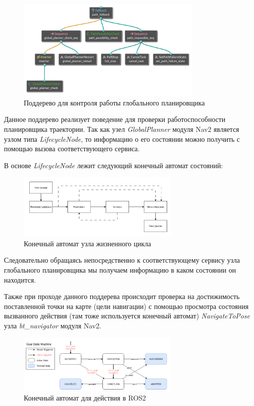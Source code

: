 \begin{figure}[h]
    \centering
    \includegraphics[width=0.8\textwidth]{images/chap_3/global_planner_subtree.png}
    \caption{Поддерево для контроля работы глобального планировщика}
    \label{fig:global_planner_subtree}
\end{figure}

Данное поддерево реализует поведение для проверки работоспособности планировщика траектории. Так как узел \textit{GlobalPlanner} модуля Nav2 является узлом типа \textit{LifecycleNode}, то информацию о его состоянии можно получить с помощью вызова соответствующего сервиса. 

В основе \textit{LifecycleNode} лежит следующий конечный автомат состояний:

\begin{figure}[h]
    \centering
    \includegraphics[width=0.7\textwidth]{images/chap_3/lifecycling.png}
    \caption{Конечный автомат узла жизненного цикла}
    \label{fig:lifecycling}
\end{figure}

Следовательно обращаясь непосредственно к соответствующему сервису узла глобального планировщика мы получаем информацию в каком состоянии он находится. 

Также при проходе данного поддерева происходит проверка на достижимость поставленной точки на карте (цели навигации) с помощью просмотра состояния вызванного действия (там тоже используется конечный автомат) \textit{NavigateToPose} узла \textit{bt\_navigator} модуля Nav2.

\begin{figure}[h]
    \centering
    \includegraphics[width=0.7\textwidth]{images/chap_3/action_fsm.png}
    \caption{Конечный автомат для действия в ROS2}
    \label{fig:action_fsm}
\end{figure}

